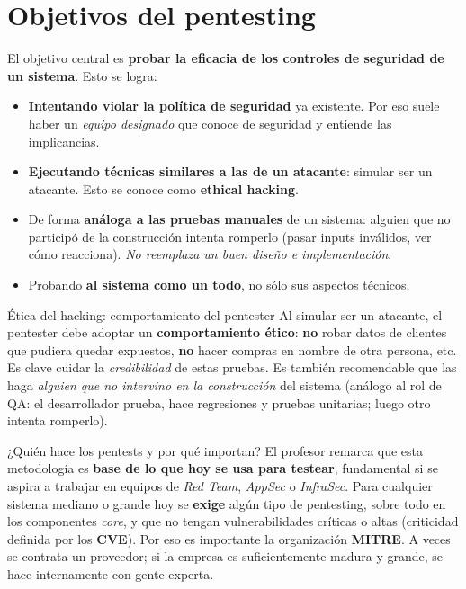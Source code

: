 \documentclass[11pt,a4paper]{article}
\newcommand{\factor}[1]{\textcolor{itbaCyanDark}{\textbf{#1}}}
\begin{document}
\section{Objetivos del pentesting}

El objetivo central es \textbf{probar la eficacia de los controles de seguridad de un
sistema}. Esto se logra:

\begin{itemize}[leftmargin=1.6em,itemsep=3pt]
  \item \textbf{Intentando violar la política de seguridad} ya existente. Por eso suele haber
        un \emph{equipo designado} que conoce de seguridad y entiende las implicancias.
  \item \textbf{Ejecutando técnicas similares a las de un atacante}: simular ser un atacante.
        Esto se conoce como \factor{ethical hacking}.
  \item De forma \textbf{análoga a las pruebas manuales} de un sistema: alguien que no
        participó de la construcción intenta romperlo (pasar inputs inválidos, ver cómo
        reacciona). \emph{No reemplaza un buen diseño e implementación}.
  \item Probando \textbf{al sistema como un todo}, no sólo sus aspectos técnicos.
\end{itemize}

\begin{warnbox}{Ética del hacking: comportamiento del pentester}
Al simular ser un atacante, el pentester debe adoptar un \textbf{comportamiento ético}:
\textbf{no} robar datos de clientes que pudiera quedar expuestos, \textbf{no} hacer compras
en nombre de otra persona, etc. Es clave cuidar la \emph{credibilidad} de estas pruebas. Es
también recomendable que las haga \emph{alguien que no intervino en la construcción} del
sistema (análogo al rol de QA: el desarrollador prueba, hace regresiones y pruebas unitarias;
luego otro intenta romperlo).
\end{warnbox}

\begin{notebox}{¿Quién hace los pentests y por qué importan?}
El profesor remarca que esta metodología es \textbf{base de lo que hoy se usa para testear},
fundamental si se aspira a trabajar en equipos de \emph{Red Team}, \emph{AppSec} o
\emph{InfraSec}. Para cualquier sistema mediano o grande hoy se \textbf{exige} algún tipo de
pentesting, sobre todo en los componentes \emph{core}, y que no tengan vulnerabilidades
críticas o altas (criticidad definida por los \textbf{CVE}). Por eso es importante la
organización \textbf{MITRE}. A veces se contrata un proveedor; si la empresa es
suficientemente madura y grande, se hace internamente con gente experta.
\end{notebox}
\end{document}
